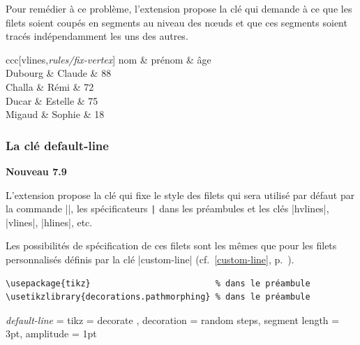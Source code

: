 \documentclass[dvipsnames]{article}
\begin{document}
\goodbreak
Pour remédier à ce problème, l'extension  propose la clé
 qui demande à ce que les filets soient coupés en segments
au niveau des nœuds et que ces segments soient tracés indépendamment les uns des autres.

\medskip
\begin{Code}[width=9.5cm,show-output]
\begin{NiceTabular}{ccc}[vlines,\emph{rules/fix-vertex}]
\Hline
nom & prénom & âge \\
\Hline
Dubourg & Claude & 88 \\
Challa & Rémi & 72 \\
Ducar & Estelle & 75 \\
Migaud & Sophie & 18 \\[1mm]
\emph{\RandomLine}
\end{NiceTabular}
\end{Code}

\subsubsection{La clé default-line}


\colorbox{yellow!50}{\bfseries Nouveau 7.9}

L'extension  propose la clé  qui fixe
le style des filets qui sera utilisé par défaut par la commande |\Hline|, les
spécificateurs \verb+|+ dans les préambules et les clés |hvlines|, |vlines|, |hlines|, etc.

Les possibilités de spécification de ces filets sont les mêmes que pour les
filets personnalisés définis par la clé |custom-line| (cf.~\ref{custom-line},
p.~\pageref{custom-line}).


\bigskip
\begin{Verbatim}[formatcom = \footnotesize \color{gray}]
\usepackage{tikz}                         % dans le préambule
\usetikzlibrary{decorations.pathmorphing} % dans le préambule
\end{Verbatim}


\begin{footnotesize}
\begin{Code}
\NiceMatrixOptions
  {
    \emph{default-line} =
      {
        tikz =
          {
            decorate ,
            decoration = { random steps, segment length = 3pt, amplitude = 1pt }
          }
      }
  }
\end{Code}
\end{footnotesize}
\end{document}
